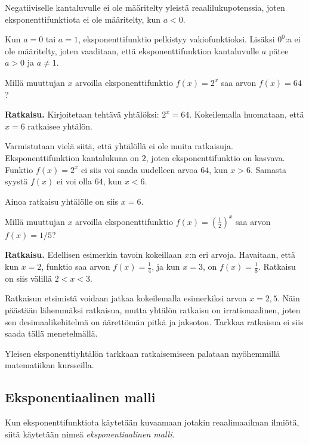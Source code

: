 Negatiiviselle kantaluvulle ei ole määritelty yleistä reaalilukupotenssia, 
joten eksponenttifunktiota ei ole määritelty, kun $a < 0$. 

Kun $a=0$ tai $a=1$, eksponenttifunktio pelkistyy vakiofunktioksi.
Lisäksi $0^0$:a ei ole määritelty, joten vaaditaan, että
eksponenttifunktion kantaluvulle $a$ pätee $a>0$ ja $a \neq 1$.


\begin{esimerkki}
Millä muuttujan $x$ arvoilla eksponenttifunktio $f(x) = 2^x$ saa arvon
$f(x) = 64$?

\textbf{Ratkaisu.}
Kirjoitetaan tehtävä yhtälöksi: $2^x = 64$. Kokeilemalla huomataan,
että $x = 6$ ratkaisee yhtälön.

Varmistutaan vielä siitä, että yhtälöllä ei ole muita ratkaisuja.
Eksponenttifunktion kantalukuna on $2$, joten eksponenttifunktio on
kasvava. Funktio $f(x) = 2^x$ ei siis voi saada uudelleen arvoa $64$,
kun $x > 6$. Samasta syystä $f(x)$ ei voi olla $64$, kun $x < 6$.

Ainoa ratkaisu yhtälölle on siis $x = 6$.
\end{esimerkki}

\begin{esimerkki}
Millä muuttujan $x$ arvoilla eksponenttifunktio
$f(x) = \left( \frac{1}{2} \right)^{x}$ saa arvon
$f(x) = 1/5$?

\textbf{Ratkaisu.}
Edellisen esimerkin tavoin kokeillaan $x$:n eri arvoja. Havaitaan,
että kun $x = 2$, funktio saa arvon $f(x) = \frac{1}{4}$, ja
kun $x = 3$, on $f(x) = \frac{1}{8}$. Ratkaisu on siis välillä
$2 < x < 3$.

Ratkaisun etsimistä voidaan jatkaa kokeilemalla esimerkiksi
arvoa $x = 2,5$. Näin päästään lähemmäksi ratkaisua, mutta
yhtälön ratkaisu on irrationaalinen, joten sen desimaalikehitelmä
on äärettömän pitkä ja jaksoton. Tarkkaa ratkaisua ei siis saada tällä menetelmällä.

Yleisen eksponenttiyhtälön tarkkaan ratkaisemiseen palataan myöhemmillä
matematiikan kursseilla.
\end{esimerkki}


\subsection*{Eksponentiaalinen malli}

Kun eksponenttifunktiota käytetään kuvaamaan jotakin reaalimaailman
ilmiötä, siitä käytetään nimeä \emph{eksponentiaalinen malli}.

